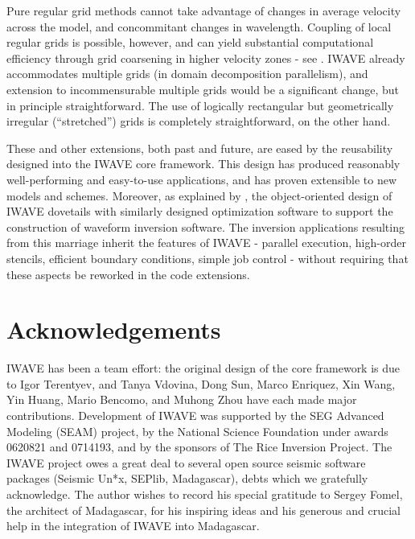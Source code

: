 Pure regular grid methods cannot take advantage of changes in average
velocity across the model, and concommitant changes in
wavelength. Coupling of local regular grids is possible, however, and
can yield substantial computational efficiency through grid coarsening
in higher velocity zones - see \cite{moczoetal:06}. IWAVE already
accommodates multiple grids (in domain decomposition parallelism), and
extension to incommensurable multiple grids would be a significant
change, but in principle
straightforward. The use of logically rectangular but
geometrically irregular (``stretched'') grids is completely
straightforward, on the other hand. 

These and other extensions, both past and future, are eased by the
reusability designed into the IWAVE core framework. This design has produced
reasonably well-performing and easy-to-use applications, and has proven
extensible to new models and schemes. Moreover, as explained by
\cite{GeoPros:11}, the object-oriented design of IWAVE dovetails with
similarly designed optimization software to support the construction
of waveform inversion software. The inversion applications resulting
from this marriage inherit the features of IWAVE - parallel execution,
high-order stencils, efficient boundary conditions, simple job control
- without requiring that these aspects be reworked in the code extensions. 

\section{Acknowledgements}
IWAVE has been a team effort: the original design of the core
framework is due to Igor Terentyev, and Tanya Vdovina, Dong Sun, Marco
Enriquez, Xin Wang, Yin Huang, Mario Bencomo, and Muhong Zhou have each made major contributions.
Development of IWAVE was supported by the SEG Advanced Modeling (SEAM)
project, by the National Science Foundation under awards 0620821 and
0714193, and by the sponsors of The Rice Inversion Project. The IWAVE
project owes a great deal to several open source seismic software
packages (Seismic Un*x, SEPlib, Madagascar), debts which we gratefully
acknowledge. The author wishes to record his special gratitude to
Sergey Fomel, the architect of Madagascar, for his inspiring ideas and
his generous and crucial help in the integration of IWAVE into Madagascar.





